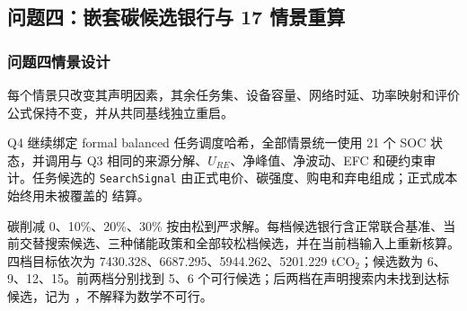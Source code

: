 \subsection{问题四：嵌套碳候选银行与 17 情景重算}
\subsubsection{问题四情景设计}
每个情景只改变其声明因素，其余任务集、设备容量、网络时延、功率映射和评价公式保持不变，并从共同基线独立重启。

Q4 继续绑定 formal balanced 任务调度哈希，全部情景统一使用 21 个 SOC 状态，并调用与 Q3 相同的来源分解、$U_{RE}$、净峰值、净波动、EFC 和硬约束审计。任务候选的 \texttt{SearchSignal} 由正式电价、碳强度、购电和弃电组成；正式成本始终用未被覆盖的  结算。

碳削减 0、10\%、20\%、30\% 按由松到严求解。每档候选银行含正常联合基准、当前交替搜索候选、三种储能政策和全部较松档候选，并在当前档输入上重新核算。四档目标依次为 7430.328、6687.295、5944.262、5201.229 tCO$_2$；候选数为 6、9、12、15。前两档分别找到 5、6 个可行候选；后两档在声明搜索内未找到达标候选，记为 ，不解释为数学不可行。

